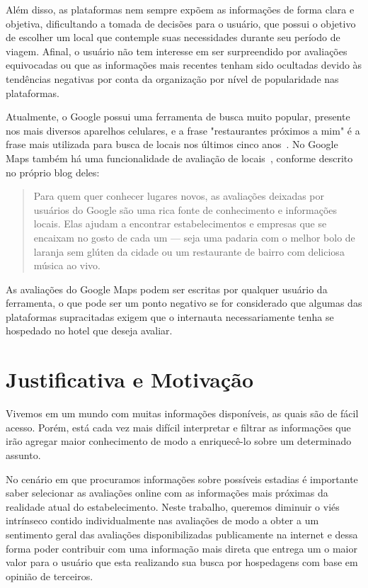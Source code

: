 Além disso, as plataformas nem sempre expõem as informações de forma clara e objetiva, dificultando a tomada de decisões para o usuário, que possui o objetivo de escolher um local que contemple suas necessidades durante seu período de viagem. Afinal, o usuário não tem interesse em ser surpreendido por avaliações equivocadas ou que as informações mais recentes tenham sido ocultadas devido às tendências negativas por conta da organização por nível de popularidade nas plataformas.

Atualmente, o Google possui uma ferramenta de busca muito popular, presente nos mais diversos aparelhos celulares, e a frase "restaurantes próximos a mim" é a frase mais utilizada para busca de locais nos últimos cinco anos~\cite{li20213}. No Google Maps também há uma funcionalidade de avaliação de locais~\cite{googleMaps2022Blog}, conforme descrito no próprio blog deles:

\begin{quote}
	Para quem quer conhecer lugares novos, as avaliações deixadas por usuários do Google são uma rica fonte de conhecimento e informações locais. Elas ajudam a encontrar estabelecimentos e empresas que se encaixam no gosto de cada um — seja uma padaria com o melhor bolo de laranja sem glúten da cidade ou um restaurante de bairro com deliciosa música ao vivo.
\end{quote}

As avaliações do Google Maps podem ser escritas por qualquer usuário da ferramenta, o que pode ser um ponto negativo se for considerado que algumas das plataformas supracitadas exigem que o internauta necessariamente tenha se hospedado no hotel que deseja avaliar.

\section{Justificativa e Motivação}

Vivemos em um mundo com muitas informações disponíveis, as quais são de fácil acesso. Porém, está cada vez mais difícil interpretar e filtrar as informações que irão agregar maior conhecimento de modo a enriquecê-lo sobre um determinado assunto.

No cenário em que procuramos informações sobre possíveis estadias é importante saber selecionar as avaliações online com as informações mais próximas da realidade atual do estabelecimento. Neste trabalho, queremos diminuir o viés intrínseco contido individualmente nas avaliações de modo a obter a um sentimento geral das avaliações disponibilizadas publicamente na internet e dessa forma poder contribuir com uma informação mais direta que entrega um o maior valor para o usuário que esta realizando sua busca por hospedagens com base em opinião de terceiros.

